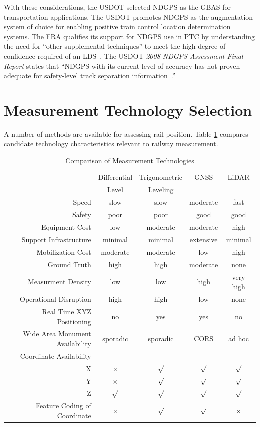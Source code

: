 With these considerations, the USDOT selected NDGPS as the GBAS for transportation applications. The USDOT promotes NDGPS as the augmentation system of choice for enabling positive train control location determination systems. The FRA qualifies its support for NDGPS use in PTC by understanding the need for ``other supplemental techniques'' to meet the high degree of confidence required of an LDS~\citep{1995FRADiffe}. The USDOT \emph{2008 NDGPS Assessment Final Report} states that ``NDGPS with its current level of accuracy has not proven adequate for safety-level track separation information~\citep{2008USDoT_NDGPS}.''

\section{Measurement Technology Selection}

A number of methods are available for assessing rail position. Table \ref{tab:techSelect} compares candidate technology characteristics relevant to railway measurement.

\begin{table}[ht]
\begin{center}
	\caption{Comparison of Measurement Technologies}\label{tab:techSelect}
	\begin{tabular}{ r c c c c }
	\toprule
	& {Differential} & {Trigonometric} & {GNSS} & {LiDAR}\\
	& {Level} & {Leveling} &  & \\
	\midrule
{Speed} & slow & slow & moderate & fast\\
{Safety} & poor & poor & good & good\\
{Equipment Cost} & low & moderate & moderate & high\\
{Support Infrastructure} & minimal & minimal & extensive & minimal\\
{Mobilization Cost} & moderate & moderate & low & high\\
{Ground Truth} & high & high & moderate	& none\\
{Measurment Density} & low & low & high & very high\\
{Operational Disruption} & high & high & low & none\\
{Real Time XYZ Positioning} & no & yes & yes & no\\
{Wide Area Monument Availability} & sporadic & sporadic & CORS & ad hoc\\
Coordinate Availability &&\\
{X} & $\times$ & $\surd$ & $\surd$ & $\surd$\\
{Y} & $\times$ & $\surd$ & $\surd$ & $\surd$\\
{Z} & $\surd$ & $\surd$& $\surd$ & $\surd$\\
{Feature Coding of Coordinate} & $\times$ & $\surd$ & $\surd$ & $\times$\\
	\bottomrule
	\end{tabular}
\end{center}
\end{table}

